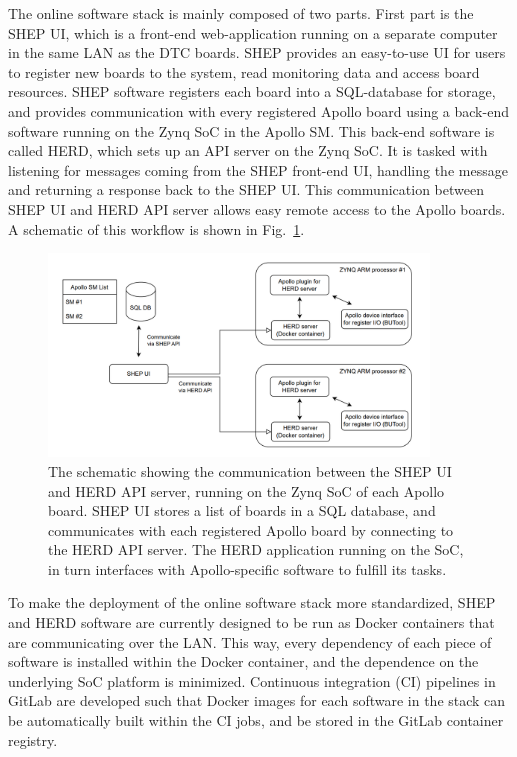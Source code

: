 The online software stack is mainly composed of two parts. First part is the SHEP UI, which is a front-end web-application
running on a separate computer in the same LAN as the DTC boards. 
SHEP provides an easy-to-use UI for users to register new boards to the system,
read monitoring data and access board resources. SHEP software registers each board into a SQL-database for storage, and
provides communication with every registered Apollo board using a back-end software running on the Zynq SoC in the Apollo SM.
This back-end software is called HERD, which sets up an API server on the Zynq SoC. It is tasked with listening for messages 
coming from the SHEP front-end UI, handling the message and returning a response back to the SHEP UI. This communication
between SHEP UI and HERD API server allows easy remote access to the Apollo boards. A schematic of this workflow is shown in
Fig.~\ref{fig:shep_herd_schematic}.

\begin{figure}[htbp]
    \centering
    \includegraphics[width=0.9\textwidth]{TrackerUpgrade/SHEP_HERD.png}
    \caption{The schematic showing the communication between the SHEP UI and HERD API server, running on the Zynq SoC of each
    Apollo board. SHEP UI stores a list of boards in a SQL database, and communicates with each registered Apollo board by
    connecting to the HERD API server. The HERD application running on the SoC, in turn interfaces with Apollo-specific software
    to fulfill its tasks.}
    \label{fig:shep_herd_schematic}
\end{figure}

To make the deployment of the online software stack more standardized, SHEP and HERD software are currently designed to be run
as Docker containers that are communicating over the LAN. This way, every dependency of each piece of software is installed within
the Docker container, and the dependence on the underlying SoC platform is minimized. Continuous integration (CI) pipelines in
GitLab are developed such that Docker images for each software in the stack can be automatically built within the CI jobs, and
be stored in the GitLab container registry.

\clearpage
